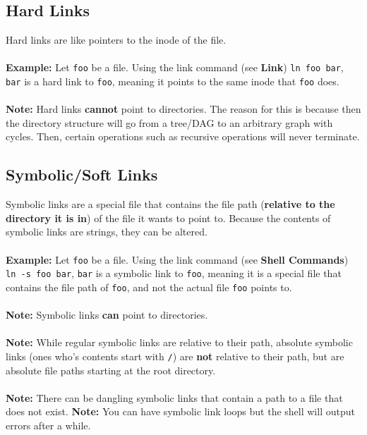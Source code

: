 \documentclass[13pt]{article}
\begin{document}
\subsection{Hard Links}
Hard links are like pointers to the inode of the file. \\ \\
\textbf{Example:} Let \texttt{foo} be a file. Using the link command (see \textbf{Link}) \texttt{ln foo bar}, \texttt{bar} is a hard link to \texttt{foo}, meaning it points to the same inode that \texttt{foo} does. \\ \\
\textbf{Note:} Hard links \textbf{cannot} point to directories. The reason for this is because then the directory structure will go from a tree/DAG to an arbitrary graph with cycles. Then, certain operations such as recursive operations will never terminate.

\subsection{Symbolic/Soft Links}
Symbolic links are a special file that contains the file path (\textbf{relative to the directory it is in}) of the file it wants to point to. Because the contents of symbolic links are strings, they can be altered. \\ \\
\textbf{Example:} Let \texttt{foo} be a file. Using the link command (see \textbf{Shell Commands}) \texttt{ln -s foo bar}, \texttt{bar} is a symbolic link to \texttt{foo}, meaning it is a special file that contains the file path of \texttt{foo}, and not the actual file \texttt{foo} points to. \\ \\
\textbf{Note:} Symbolic links \textbf{can} point to directories. \\ \\
\textbf{Note:} While regular symbolic links are relative to their path, absolute symbolic links (ones who's contents start with \texttt{/}) are \textbf{not} relative to their path, but are absolute file paths starting at the root directory. \\ \\
\textbf{Note:} There can be dangling symbolic links that contain a path to a file that does not exist. 
\textbf{Note:} You can have symbolic link loops but the shell will output errors after a while.
\end{document}
